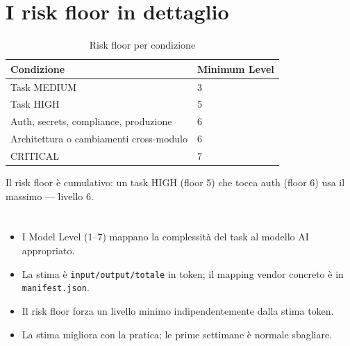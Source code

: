 \section{I risk floor in dettaglio}
\label{sec:08-risk-floor}

\begin{table}[htbp]
  \centering
  \begin{tabular}{ll}
    \toprule
    \textbf{Condizione} & \textbf{Minimum Level} \\
    \midrule
    Task MEDIUM & 3 \\
    Task HIGH & 5 \\
    Auth, secrets, compliance, produzione & 6 \\
    Architettura o cambiamenti cross-modulo & 6 \\
    CRITICAL & 7 \\
    \bottomrule
  \end{tabular}
  \caption{Risk floor per condizione}
  \label{tab:08-risk-floor}
\end{table}

Il risk floor è cumulativo: un task HIGH (floor 5) che tocca auth (floor 6) usa il massimo --- livello 6.

\section*{\LabelSummary}

\begin{itemize}
  \item I Model Level (1--7) mappano la complessità del task al modello AI appropriato.
  \item La stima è \texttt{input/output/totale} in token; il mapping vendor concreto è in \texttt{manifest.json}.
  \item Il risk floor forza un livello minimo indipendentemente dalla stima token.
  \item La stima migliora con la pratica; le prime settimane è normale sbagliare.
\end{itemize}
